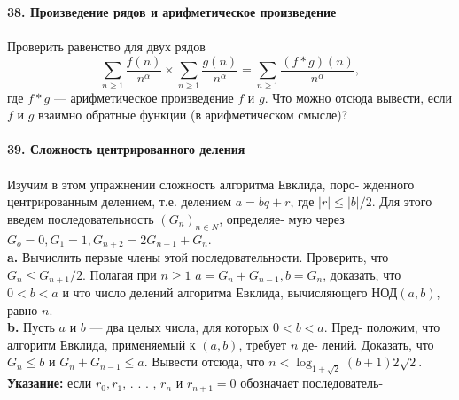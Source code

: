 \documentclass{mai_book}
\begin{document}
\noindent\textbf{38. Произведение рядов и арифметическое произведение}\\\\
\hspace*{10pt} Проверить равенство для двух рядов
\begin{equation*}
\sum_{n\geq1}\frac{f(n)}{n^\alpha}\times \sum_{n\geq1}\frac{g(n)}{n^\alpha}=\sum_{n\geq1}\frac{(f*g)(n)}{n^\alpha},
\end{equation*}
где $f * g$ — арифметическое произведение $f$ и $g$. Что можно отсюда\linebreak
вывести, если $f$ и $g$ взаимно обратные функции (в арифметическом\linebreak
смысле)?
\\
\\
\noindent\textbf{39. Сложность центрированного деления}\\\\
\hspace*{10pt} Изучим в этом упражнении сложность алгоритма Евклида, поро-\linebreak
жденного центрированным делением, т.е. делением $a = bq + r$, где\linebreak
$|r|\leq|b|/2$. Для этого введем последовательность $(G_n )_{n\in N}$, определяе-\linebreak
мую через $G_o = 0, G_1 = 1, G_{n +2} = 2G_{n +1} + G_n$.\\
\hspace*{10pt}\textbf{a.} Вычислить первые члены этой последовательности. Проверить,\linebreak
что $G_n\leq G_{n+1}/2$. Полагая при $n \geq 1$ $a = G_n + G_{n - 1}, b = G_n$, доказать,\linebreak
что $0 < b < a$ и что число делений алгоритма Евклида, вычисляющего\linebreak
НОД$(a,b)$, равно $n$.\\
\hspace*{10pt}\textbf{b.} Пусть $a$ и $b$ — два целых числа, для которых $0 < b < a$. Пред-\linebreak
положим, что алгоритм Евклида, применяемый к $(a,b)$, требует $n$ де-\linebreak
лений. Доказать, что $G_n\leq b$ и $G_n + G_{n - 1} \leq a$. Вывести отсюда, что\linebreak
$n<\log_{1+\sqrt{2}}{(b+1)}2\sqrt{2}.$\\
\noindent\textbf{Указание:} если $r_0, r_1$, . . . , $r_{n}$ и $r_{n+1}= 0$ обозначает последователь-\linebreak 
\end{document}
